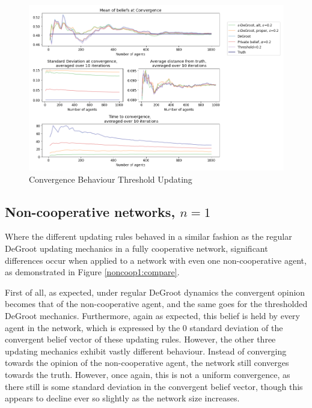 \documentclass{article}
\begin{document}
\begin{center}
    \begin{figure}[!htbp]
        \centering
        \includegraphics[width=1.2\textwidth]{ThesisKI/Images/WisdomCompare0.png}
        \caption{Convergence Behaviour Threshold Updating}
        \label{coop:compare}
    \end{figure}
\end{center}

\newpage

\subsection{Non-cooperative networks, $n=1$}

Where the different updating rules behaved in a similar fashion as the regular DeGroot updating mechanics in a fully cooperative network, significant differences occur when applied to a network with even one non-cooperative agent, as demonstrated in Figure \ref{noncoop1:compare}. 

\noindent First of all, as expected, under regular DeGroot dynamics the convergent opinion becomes that of the non-cooperative agent, and the same goes for the thresholded DeGroot mechanics. Furthermore, again as expected, this belief is held by every agent in the network, which is expressed by the $0$ standard deviation of the convergent belief vector of these updating rules. However, the other three updating mechanics exhibit vastly different behaviour. Instead of converging towards the opinion of the non-cooperative agent, the network still converges towards the truth. However, once again, this is not a uniform convergence, as there still is some standard deviation in the convergent belief vector, though this appears to decline ever so slightly as the network size increases.
\end{document}
